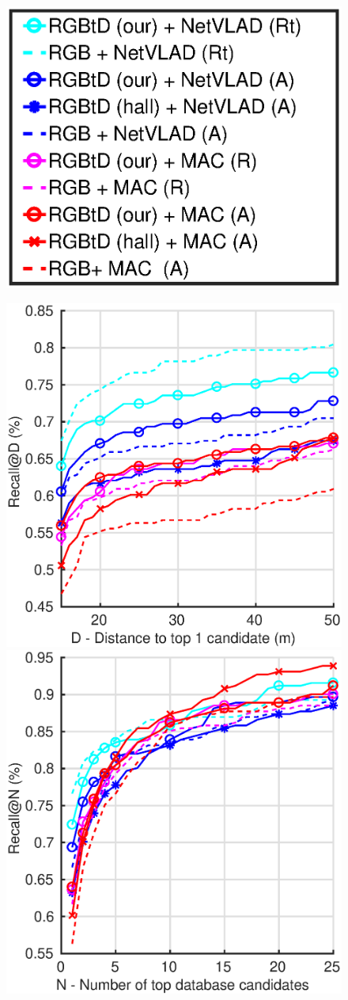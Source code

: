 \begin{figure}
	\center
	\begin{minipage}{0.14\linewidth}
		\includegraphics[trim={150 170 210 255},clip,width=\linewidth]{plot/fig/legend}	
	\end{minipage}
	\begin{minipage}{0.85\linewidth}
	
	\begin{minipage}{0.49\linewidth}		
		\center
		\includegraphics[width=0.49\linewidth]{plot/fig/sun_distance}	
		\includegraphics[width=0.49\linewidth]{plot/fig/sun_recall}
		

\end{minipage}
\end{minipage}
\end{figure}
